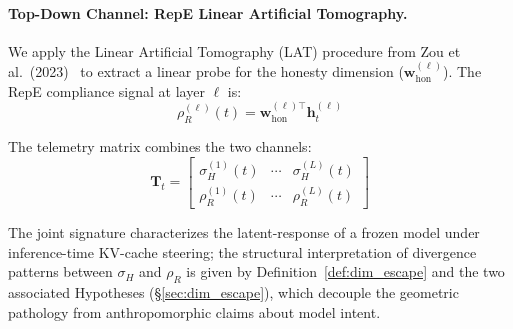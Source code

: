 \documentclass{article}
\begin{document}

\paragraph{Top-Down Channel: RepE Linear Artificial Tomography.}
We apply the Linear Artificial Tomography (LAT) procedure from Zou et al.\ (2023)~\cite{zou2023repe} to extract a linear probe for the honesty dimension ($\mathbf{w}_{\text{hon}}^{(\ell)}$). The RepE compliance signal at layer $\ell$ is:
\begin{equation}
\rho_R^{(\ell)}(t) = \mathbf{w}_{\text{hon}}^{(\ell)\top} \mathbf{h}_t^{(\ell)}
\label{eq:repe_signal}
\end{equation}

The telemetry matrix combines the two channels:
\begin{equation}
\mathbf{T}_t = \begin{bmatrix} \sigma_H^{(1)}(t) & \cdots & \sigma_H^{(L)}(t) \\ \rho_R^{(1)}(t) & \cdots & \rho_R^{(L)}(t) \end{bmatrix}
\label{eq:telemetry_matrix}
\end{equation}

The joint signature characterizes the latent-response of a frozen model under inference-time KV-cache steering; the structural interpretation of divergence patterns between $\sigma_H$ and $\rho_R$ is given by Definition~\ref{def:dim_escape} and the two associated Hypotheses (§\ref{sec:dim_escape}), which decouple the geometric pathology from anthropomorphic claims about model intent.
\end{document}
